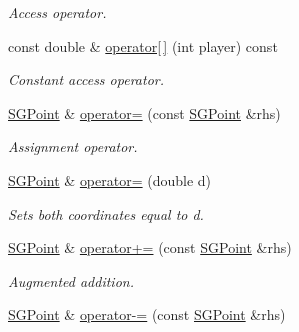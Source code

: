 \begin{DoxyCompactItemize}
\begin{DoxyCompactList}\small\item\em Access operator. \end{DoxyCompactList}\item 
\hypertarget{class_s_g_point_a23c4b005c8bc8968a806ee0458f94f9a}{const double \& \hyperlink{class_s_g_point_a23c4b005c8bc8968a806ee0458f94f9a}{operator\mbox{[}$\,$\mbox{]}} (int player) const }\label{class_s_g_point_a23c4b005c8bc8968a806ee0458f94f9a}

\begin{DoxyCompactList}\small\item\em Constant access operator. \end{DoxyCompactList}\item 
\hypertarget{class_s_g_point_aedf45913c65b31cf7363f428cbe17087}{\hyperlink{class_s_g_point}{S\+G\+Point} \& \hyperlink{class_s_g_point_aedf45913c65b31cf7363f428cbe17087}{operator=} (const \hyperlink{class_s_g_point}{S\+G\+Point} \&rhs)}\label{class_s_g_point_aedf45913c65b31cf7363f428cbe17087}

\begin{DoxyCompactList}\small\item\em Assignment operator. \end{DoxyCompactList}\item 
\hypertarget{class_s_g_point_a1766a2ef73345b9017c214c7eeed6b7e}{\hyperlink{class_s_g_point}{S\+G\+Point} \& \hyperlink{class_s_g_point_a1766a2ef73345b9017c214c7eeed6b7e}{operator=} (double d)}\label{class_s_g_point_a1766a2ef73345b9017c214c7eeed6b7e}

\begin{DoxyCompactList}\small\item\em Sets both coordinates equal to d. \end{DoxyCompactList}\item 
\hypertarget{class_s_g_point_a65eb9c1b564b55fadcae4e5a0b75c7a4}{\hyperlink{class_s_g_point}{S\+G\+Point} \& \hyperlink{class_s_g_point_a65eb9c1b564b55fadcae4e5a0b75c7a4}{operator+=} (const \hyperlink{class_s_g_point}{S\+G\+Point} \&rhs)}\label{class_s_g_point_a65eb9c1b564b55fadcae4e5a0b75c7a4}

\begin{DoxyCompactList}\small\item\em Augmented addition. \end{DoxyCompactList}\item 
\hypertarget{class_s_g_point_aef6456278892c01cd4ef0881f10d2082}{\hyperlink{class_s_g_point}{S\+G\+Point} \& \hyperlink{class_s_g_point_aef6456278892c01cd4ef0881f10d2082}{operator-\/=} (const \hyperlink{class_s_g_point}{S\+G\+Point} \&rhs)}\label{class_s_g_point_aef6456278892c01cd4ef0881f10d2082}


\end{DoxyCompactItemize}
